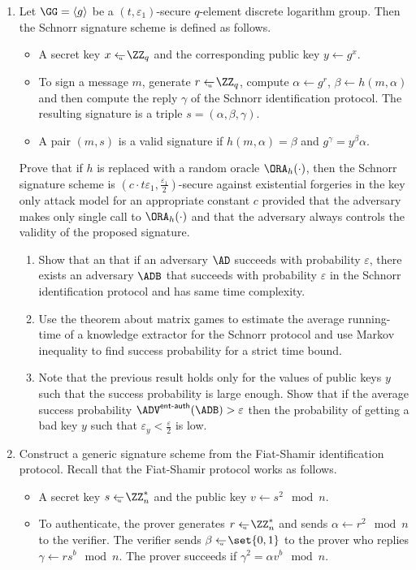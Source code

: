 \documentclass{article}
\begin{document}
\begin{enumerate}
\item Let $\GG=\langle g\rangle$ be a $(t,\varepsilon_1)$-secure
  $q$-element discrete logarithm group. Then the Schnorr signature
  scheme is defined as follows.
  \begin{itemize}
  \item  A secret key $x\getsu\ZZ_q$ and the corresponding public key $y\gets g^x$.
  \item To sign a message $m$, generate $r\getsu\ZZ_q$, compute
    $\alpha\gets g^r$, $\beta\gets h(m,\alpha)$ and then compute the
    reply $\gamma$ of the Schnorr identification protocol. The
    resulting signature is a triple $s=(\alpha,\beta,\gamma)$.
  \item A pair $(m,s)$ is a valid signature if $h(m,\alpha)=\beta$ and
    $g^\gamma=y^\beta\alpha$.
  \end{itemize}
  Prove that if $h$ is replaced with a random oracle $\ORA_h(\cdot)$,
  then the Schnorr signature scheme is $(c\cdot
  t\varepsilon_1,\frac{\varepsilon_1}{2})$-secure against existential
  forgeries in the key only attack model for an appropriate constant
  $c$ provided that the adversary makes only single call to
  $\ORA_h(\cdot)$ and that the adversary always controls the validity
  of the proposed signature.
  \begin{enumerate}
  \item Show that an that if an adversary $\AD$ succeeds with
    probability $\varepsilon$, there exists an adversary $\ADB$ that
    succeeds with probability $\varepsilon$ in the Schnorr
    identification protocol and has same time complexity.
  \item Use the theorem about matrix games to estimate the average
    running-time of a knowledge extractor for the Schnorr protocol and
    use Markov inequality to find success probability for a strict
    time bound.
  \item Note that the previous result holds only for the values of
    public keys $y$ such that the success probability is large
    enough. Show that if the average success probability
    $\advEAUTHXX{}{\ADB}> \varepsilon$ then the probability of getting
    a bad key $y$ such that $\varepsilon_y<\frac{\varepsilon}{2}$ is
    low.
  \end{enumerate}

\item Construct a generic signature scheme from the Fiat-Shamir
  identification protocol. Recall that the Fiat-Shamir protocol works
  as follows.
  \begin{itemize}
  \item A secret key $s\getsu\ZZ_n^*$ and the public key $v\gets
    s^2\mod n$.
  \item To authenticate, the prover generates $r\getsu\ZZ_n^*$ and
    sends $\alpha\gets r^2\mod n$ to the verifier. The verifier sends
    $\beta\getsu\set{0,1}$ to the prover who replies $\gamma\gets
    rs^b\mod n$. The prover succeeds if $\gamma^2=\alpha v^b\mod n$.
  \end{itemize}



\end{enumerate}
\end{document}
